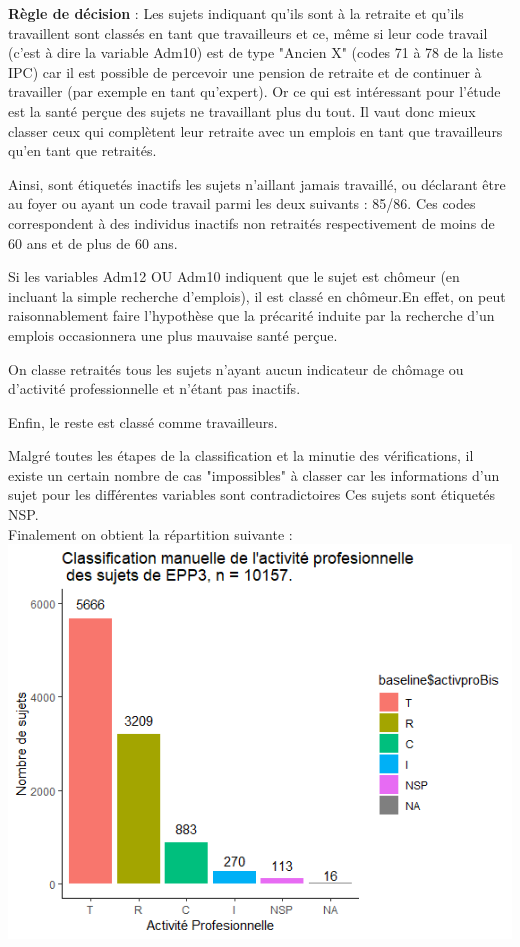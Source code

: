 \documentclass{book}
\begin{document}
\noindent
\textbf{Règle de décision} : 
Les sujets indiquant qu'ils sont à la retraite et qu'ils travaillent sont classés en tant que travailleurs et ce, même si leur code travail (c'est à dire la variable Adm10) est de type "Ancien X" (codes 71 à 78 de la liste IPC) car il est possible de percevoir une pension de retraite et de continuer à travailler (par exemple en tant qu'expert). Or ce qui est intéressant pour l'étude est la santé perçue des sujets ne travaillant plus du tout. Il vaut donc mieux classer ceux qui complètent leur retraite avec un emplois en tant que travailleurs qu'en tant que retraités.

\noindent
Ainsi, sont étiquetés inactifs les sujets n'aillant jamais travaillé, ou déclarant être au foyer ou ayant un code travail parmi les deux suivants : 85/86. Ces codes correspondent à des individus inactifs non retraités respectivement de moins de 60 ans et de plus de 60 ans.

\noindent
Si les variables Adm12 OU Adm10 indiquent que le sujet est chômeur (en incluant la simple recherche d'emplois), il est classé en chômeur.En effet, on peut raisonnablement faire l'hypothèse que la précarité induite par la recherche d'un emplois occasionnera une plus mauvaise santé perçue.

\noindent
On classe retraités tous les sujets n'ayant aucun indicateur de chômage ou d'activité professionnelle et n'étant pas inactifs.

\noindent
Enfin, le reste est classé comme travailleurs.

\noindent
Malgré toutes les étapes de la classification et la minutie des vérifications, il  existe un certain nombre de cas "impossibles" à classer car les informations d'un sujet pour les différentes variables sont contradictoires Ces sujets sont étiquetés NSP.\\

\noindent
Finalement on obtient la répartition suivante : \\
\bigskip
\includegraphics[scale=1]{activpro_barplot_manuel.png}
\end{document}

